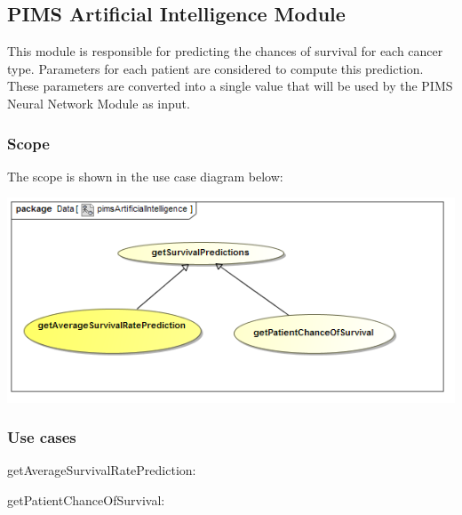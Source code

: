 \subsection{PIMS Artificial Intelligence Module}
This module is responsible for predicting the chances of survival for each cancer type. Parameters for each patient are considered to compute this prediction. These parameters are converted into a single value that will be used by the PIMS Neural Network Module as input. \par 

\subsubsection{Scope}
The scope is shown in the use case diagram below: \par
\includegraphics[width=0.75\linewidth]{./Graphics/pimsAI/pimsArtificialIntelligence}

\subsubsection{Use cases}
\begin{description}
	\item{getAverageSurvivalRatePrediction:} 
	\item{getPatientChanceOfSurvival:}
\end{description}